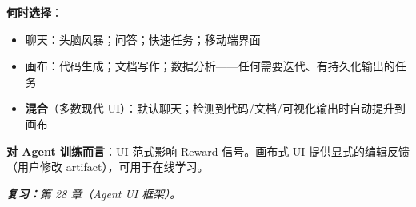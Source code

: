 \begin{questionbox}
\textbf{何时选择}：

\begin{itemize}
  \item 聊天：头脑风暴；问答；快速任务；移动端界面
  \item 画布：代码生成；文档写作；数据分析——任何需要迭代、有持久化输出的任务
  \item \textbf{混合}（多数现代 UI）：默认聊天；检测到代码/文档/可视化输出时自动提升到画布
\end{itemize}

\textbf{对 Agent 训练而言}：UI 范式影响 Reward 信号。画布式 UI 提供显式的编辑反馈（用户修改 artifact），可用于在线学习。

\emph{\textbf{复习：}第 28 章（Agent UI 框架）。}
\end{questionbox}

